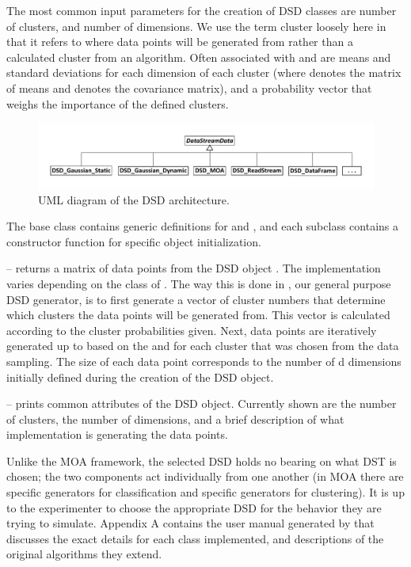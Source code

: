 \documentclass[nojss]{jss}
\begin{document}
The most common input parameters for the creation of DSD classes are  number of clusters, and  number of dimensions. We use the term cluster loosely here in that it refers to where data points will be generated from rather than a calculated cluster from an algorithm. Often associated with  and  are means and standard deviations for each dimension of each cluster (where  denotes the matrix of means and  denotes the covariance matrix), and a probability vector that weighs the importance of the defined clusters.

\begin{figure}
\centering
\includegraphics{dsd_uml}
\caption{UML diagram of the DSD architecture.}
\label{figure:dsd}
\end{figure}

The base class contains generic definitions for  and , and each subclass contains a constructor function for specific object initialization. 


%
 – returns a matrix of data points from the DSD object . The implementation varies depending on the class of . The way this is done in , our general purpose DSD generator, is to first generate a vector of cluster numbers that determine which clusters the data points will be generated from. This vector is calculated according to the cluster probabilities given. Next, data points are iteratively generated up to  based on the  and  for each cluster that was chosen from the data sampling. The size of each data point corresponds to the number of d dimensions initially defined during the creation of the DSD object.


%
 – prints common attributes of the DSD object. Currently shown are the number of clusters, the number of dimensions, and a brief description of what implementation is generating the data points.


Unlike the MOA framework, the selected DSD holds no bearing on what DST is chosen; the two components act individually from one another (in MOA there are specific generators for classification and specific generators for clustering). It is up to the experimenter to choose the appropriate DSD for the behavior they are trying to simulate. Appendix A contains the user manual generated by  that discusses the exact details for each class implemented, and descriptions of the original algorithms they extend.
\end{document}
